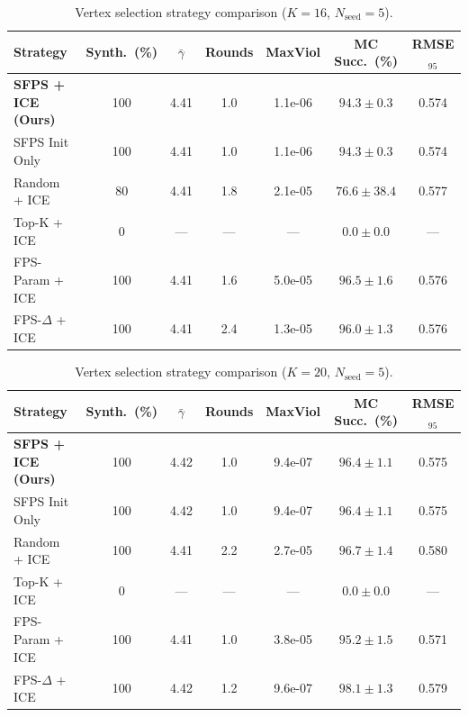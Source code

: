 \begin{table}[htbp]
\centering
\caption{Vertex selection strategy comparison ($K=16$, $N_\mathrm{seed}=5$).}
\label{tab:vsel_K16}
\begin{tabular}{l c c c c c c}
\toprule
\textbf{Strategy} & \textbf{Synth.\ (\%)} & \textbf{$\bar\gamma$} & \textbf{Rounds} & \textbf{MaxViol} & \textbf{MC Succ.\ (\%)} & \textbf{RMSE$_{95}$} \\
\midrule
\textbf{SFPS + ICE (Ours)} & 100 & 4.41 & 1.0 & 1.1e-06 & $94.3 \pm 0.3$ & 0.574 \\
SFPS Init Only & 100 & 4.41 & 1.0 & 1.1e-06 & $94.3 \pm 0.3$ & 0.574 \\
Random + ICE & 80 & 4.41 & 1.8 & 2.1e-05 & $76.6 \pm 38.4$ & 0.577 \\
Top-K + ICE & 0 & --- & --- & --- & $0.0 \pm 0.0$ & --- \\
FPS-Param + ICE & 100 & 4.41 & 1.6 & 5.0e-05 & $96.5 \pm 1.6$ & 0.576 \\
FPS-$\Delta$ + ICE & 100 & 4.41 & 2.4 & 1.3e-05 & $96.0 \pm 1.3$ & 0.576 \\
\bottomrule
\end{tabular}
\end{table}

\begin{table}[htbp]
\centering
\caption{Vertex selection strategy comparison ($K=20$, $N_\mathrm{seed}=5$).}
\label{tab:vsel_K20}
\begin{tabular}{l c c c c c c}
\toprule
\textbf{Strategy} & \textbf{Synth.\ (\%)} & \textbf{$\bar\gamma$} & \textbf{Rounds} & \textbf{MaxViol} & \textbf{MC Succ.\ (\%)} & \textbf{RMSE$_{95}$} \\
\midrule
\textbf{SFPS + ICE (Ours)} & 100 & 4.42 & 1.0 & 9.4e-07 & $96.4 \pm 1.1$ & 0.575 \\
SFPS Init Only & 100 & 4.42 & 1.0 & 9.4e-07 & $96.4 \pm 1.1$ & 0.575 \\
Random + ICE & 100 & 4.41 & 2.2 & 2.7e-05 & $96.7 \pm 1.4$ & 0.580 \\
Top-K + ICE & 0 & --- & --- & --- & $0.0 \pm 0.0$ & --- \\
FPS-Param + ICE & 100 & 4.41 & 1.0 & 3.8e-05 & $95.2 \pm 1.5$ & 0.571 \\
FPS-$\Delta$ + ICE & 100 & 4.42 & 1.2 & 9.6e-07 & $98.1 \pm 1.3$ & 0.579 \\
\bottomrule
\end{tabular}
\end{table}

